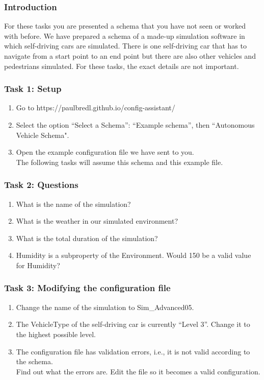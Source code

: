 \subsubsection{Introduction}
For these tasks you are presented a schema that you have not seen or worked with before.
We have prepared a schema of a made-up simulation software in which self-driving cars are simulated.
There is one self-driving car that has to navigate from a start point to an end point but there are also other vehicles and pedestrians simulated.
For these tasks, the exact details are not important.

\subsubsection{Task 1: Setup}
\begin{enumerate}
    \item Go to https://paulbredl.github.io/config-assistant/
    \item Select the option ``Select a Schema'': ``Example schema'', then ``Autonomous Vehicle Schema".
    \item Open the example configuration file we have sent to you. \\
          The following tasks will assume this schema and this example file.
\end{enumerate}

\subsubsection{Task 2: Questions}
\begin{enumerate}
    \item What is the name of the simulation?
    \item What is the weather in our simulated environment?
    \item What is the total duration of the simulation?
    \item Humidity is a subproperty of the Environment.
    Would 150 be a valid value for Humidity?
\end{enumerate}

\subsubsection{Task 3: Modifying the configuration file}
\begin{enumerate}
    \item Change the name of the simulation to Sim\_Advanced05.
    \item The VehicleType of the self-driving car is currently ``Level 3''.
    Change it to the highest possible level.
    \item The configuration file has validation errors, i.e., it is not valid according to the schema.
    \\ Find out what the errors are.
    Edit the file so it becomes a valid configuration.

\end{enumerate}


